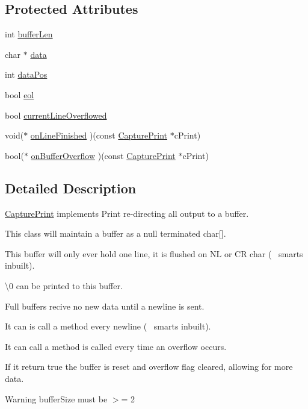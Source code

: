 \subsection*{Protected Attributes}
\begin{DoxyCompactItemize}
\item 
int \hyperlink{class_capture_print_a2e3ac2d502b2918e3cd58fdd737467b9}{buffer\+Len}
\item 
char $\ast$ \hyperlink{class_capture_print_a25bb02cd05faee2fc28b82c86178c7c6}{data}
\item 
int \hyperlink{class_capture_print_ad7dfa3e9565787e2e80c19fb388c2b05}{data\+Pos}
\item 
bool \hyperlink{class_capture_print_a9f90066b7a79f5cd084e7f7b2ecbe232}{eol}
\item 
bool \hyperlink{class_capture_print_a8ba3d733760230f4c520dc88c81f6911}{current\+Line\+Overflowed}
\item 
void($\ast$ \hyperlink{class_capture_print_a37eb0324e0edeaafb8d4e15118fef58f}{on\+Line\+Finished} )(const \hyperlink{class_capture_print}{Capture\+Print} $\ast$c\+Print)
\item 
bool($\ast$ \hyperlink{class_capture_print_a601a9fdcb038b2e5d818083c58f5fff0}{on\+Buffer\+Overflow} )(const \hyperlink{class_capture_print}{Capture\+Print} $\ast$c\+Print)
\end{DoxyCompactItemize}


\subsection{Detailed Description}
\hyperlink{class_capture_print}{Capture\+Print} implements Print re-\/directing all output to a buffer.
\begin{DoxyItemize}
\item This class will maintain a buffer as a null terminated char\mbox{[}\mbox{]}.
\item This buffer will only ever hold one line, it is flushed on N\+L or C\+R char (~\newline
 smarts inbuilt).
\item \textbackslash{}0 can be printed to this buffer.
\item Full buffers recive no new data until a newline is sent.
\item It can is call a method every newline (~\newline
 smarts inbuilt).
\item It can call a method is called every time an overflow occurs.
\begin{DoxyItemize}
\item If it return true the buffer is reset and overflow flag cleared, allowing for more data.
\end{DoxyItemize}
\end{DoxyItemize}\begin{DoxyWarning}{Warning}
buffer\+Size must be $>$= 2 
\end{DoxyWarning}


